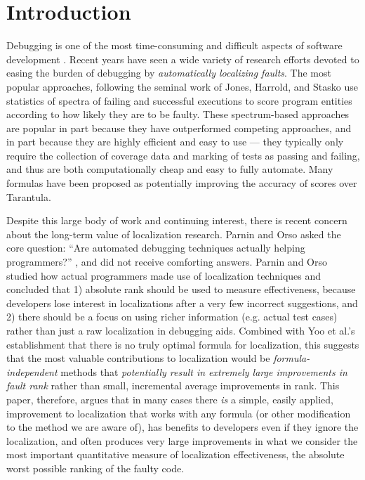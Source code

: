 \section{Introduction}
Debugging is one of the most time-consuming and difficult aspects of
software development \cite{Vesey,BallVis}.  Recent years have seen a
wide variety of research efforts devoted to easing the burden of
debugging by \emph{automatically localizing faults}.  The most popular
approaches, following the seminal work of Jones, Harrold, and Stasko
\cite{Jones2002,Tarantula} use statistics of spectra \cite{RepsSpectra} of
failing and successful executions to score program entities according
to how likely they are to be faulty.  These spectrum-based approaches
are popular in part because they have outperformed competing
approaches, and in part because they are highly efficient and easy to
use --- they typically only require the collection of coverage data
and marking of tests as passing and failing, and thus are both
computationally cheap and easy to fully automate.  Many formulas have
been proposed as potentially improving the accuracy of scores
\cite{Ochai,AMPLE,Pinpoint,StatDebug,Abreu:2006:PRDC} over Tarantula.

Despite this large body of work and continuing interest, there is recent concern about the long-term value
of localization research.  Parnin and Orso asked the core
question: ``Are automated debugging techniques actually helping
programmers?''  \cite{AutoHelp}, and did not receive comforting
answers.  Parnin and Orso studied how actual programmers made use of localization techniques \cite{AutoHelp}
and concluded that 1) absolute rank should be used to
measure effectiveness, because developers lose interest in
localizations after a very few incorrect suggestions, and 2) there should be a focus on
using richer information (e.g. actual test cases) rather than just
a raw localization in debugging aids.  Combined with Yoo et al.'s
establishment \cite{yoo2014no} that there is no truly optimal formula
for localization, this suggests that the most valuable contributions
to localization would be \emph{formula-independent} methods that
\emph{potentially result in extremely large improvements in fault
rank} rather than small, incremental average improvements in rank.
This paper, therefore, argues that in many cases there \emph{is} a
simple, easily applied, improvement to localization that works with
any formula (or other modification to the method we are aware of), has
benefits to developers even if they ignore the localization, and often
produces very large improvements in what we consider the most
important quantitative measure of localization effectiveness, the absolute worst
possible ranking of the faulty code.

